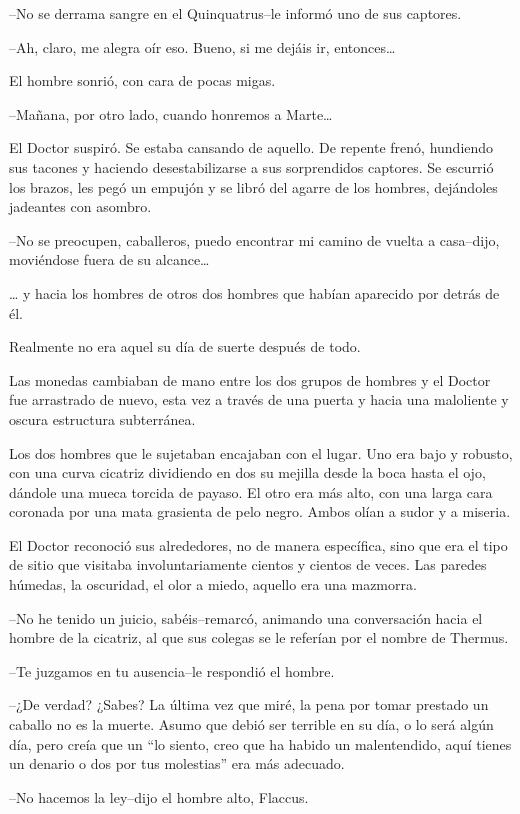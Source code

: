 --No se derrama sangre en el Quinquatrus--le informó uno de sus
captores.

--Ah, claro, me alegra oír eso. Bueno, si me dejáis ir, entonces\ldots{}

El hombre sonrió, con cara de pocas migas.

--Mañana, por otro lado, cuando honremos a Marte\ldots{}

El Doctor suspiró. Se estaba cansando de aquello. De repente frenó,
hundiendo sus tacones y haciendo desestabilizarse a sus sorprendidos
captores. Se escurrió los brazos, les pegó un empujón y se libró del
agarre de los hombres, dejándoles jadeantes con asombro.

--No se preocupen, caballeros, puedo encontrar mi camino de vuelta a
casa--dijo, moviéndose fuera de su alcance\ldots{}

\ldots{} y hacia los hombres de otros dos hombres que habían aparecido
por detrás de él.

Realmente no era aquel su día de suerte después de todo.

Las monedas cambiaban de mano entre los dos grupos de hombres y el
Doctor fue arrastrado de nuevo, esta vez a través de una puerta y hacia
una maloliente y oscura estructura subterránea.

Los dos hombres que le sujetaban encajaban con el lugar. Uno era bajo y
robusto, con una curva cicatriz dividiendo en dos su mejilla desde la
boca hasta el ojo, dándole una mueca torcida de payaso. El otro era más
alto, con una larga cara coronada por una mata grasienta de pelo negro.
Ambos olían a sudor y a miseria.

El Doctor reconoció sus alrededores, no de manera específica, sino que
era el tipo de sitio que visitaba involuntariamente cientos y cientos de
veces. Las paredes húmedas, la oscuridad, el olor a miedo, aquello era
una mazmorra.

--No he tenido un juicio, sabéis--remarcó, animando una conversación
hacia el hombre de la cicatriz, al que sus colegas se le referían por el
nombre de Thermus.

--Te juzgamos en tu ausencia--le respondió el hombre.

--¿De verdad? ¿Sabes? La última vez que miré, la pena por tomar prestado
un caballo no es la muerte. Asumo que debió ser terrible en su día, o lo
será algún día, pero creía que un ``lo siento, creo que ha habido un
malentendido, aquí tienes un denario o dos por tus molestias'' era más
adecuado.

--No hacemos la ley--dijo el hombre alto, Flaccus.

